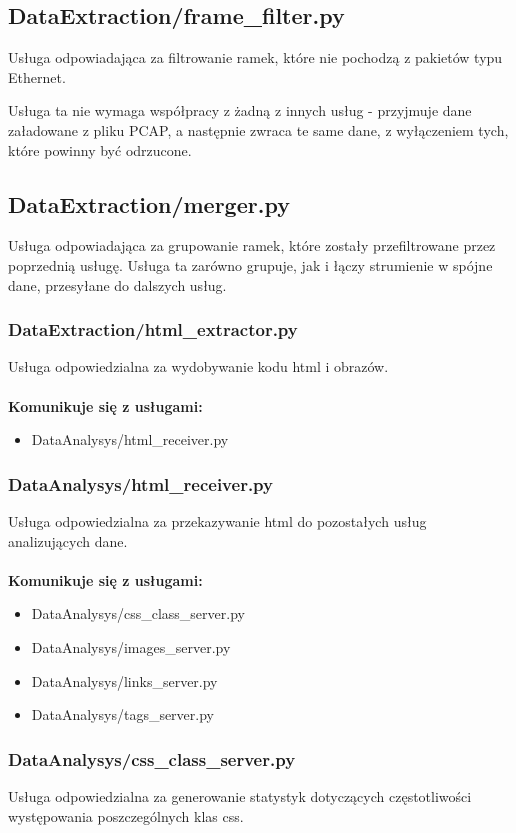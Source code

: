 \documentclass[12pt]{article}
\begin{document}
\subsection{DataExtraction/frame\_filter.py}
Usługa odpowiadająca za filtrowanie ramek, które nie pochodzą z pakietów typu Ethernet.

Usługa ta nie wymaga współpracy z żadną z innych usług - przyjmuje dane załadowane z pliku PCAP, a następnie zwraca te same dane, z wyłączeniem tych, które powinny być odrzucone. 

\subsection{DataExtraction/merger.py}
Usługa odpowiadająca za grupowanie ramek, które zostały przefiltrowane przez poprzednią usługę. Usługa ta zarówno grupuje, jak i łączy strumienie w spójne dane, przesyłane do dalszych usług.

\subsubsection{DataExtraction/html\_extractor.py} 
Usługa odpowiedzialna za wydobywanie kodu html i obrazów.
\mbox{}\\\\
\textbf{Komunikuje się z usługami:}\\
\begin{itemize}
\item DataAnalysys/html\_receiver.py
\end{itemize} 

\subsubsection{DataAnalysys/html\_receiver.py} 
Usługa odpowiedzialna za przekazywanie html do pozostałych usług analizujących dane.
\mbox{}\\\\
\textbf{Komunikuje się z usługami:}\\
\begin{itemize}
\item DataAnalysys/css\_class\_server.py
\item DataAnalysys/images\_server.py
\item DataAnalysys/links\_server.py
\item DataAnalysys/tags\_server.py
\end{itemize} 

\subsubsection{DataAnalysys/css\_class\_server.py} 
Usługa odpowiedzialna za generowanie statystyk dotyczących częstotliwości występowania poszczególnych klas css.
\end{document}
